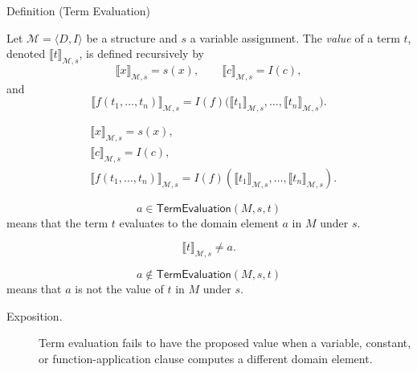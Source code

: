 \begin{definitionbox}{Definition (Term Evaluation)}
\begin{definition}
\label{def:term-interp}
Let \(\mathcal M=\langle D,I\rangle\) be a structure and \(s\) a variable
assignment. The \emph{value} of a term \(t\), denoted
\(\llbracket t\rrbracket_{\mathcal M,s}\), is defined recursively by
\[
\llbracket x\rrbracket_{\mathcal M,s}=s(x),\qquad
\llbracket c\rrbracket_{\mathcal M,s}=I(c),
\]
and
\[
\llbracket f(t_1,\ldots,t_n)\rrbracket_{\mathcal M,s}
=
I(f)\bigl(\llbracket t_1\rrbracket_{\mathcal M,s},\ldots,
\llbracket t_n\rrbracket_{\mathcal M,s}\bigr).
\]
\end{definition}
\end{definitionbox}

\begin{remark*}
\[
\begin{aligned}
&\llbracket x\rrbracket_{\mathcal M,s}=s(x),\\
&\llbracket c\rrbracket_{\mathcal M,s}=I(c),\\
&\llbracket f(t_1,\ldots,t_n)\rrbracket_{\mathcal M,s}
=I(f)(\llbracket t_1\rrbracket_{\mathcal M,s},\ldots,
\llbracket t_n\rrbracket_{\mathcal M,s}).
\end{aligned}
\]
\end{remark*}

\begin{remark*}
\[
  a\in\mathsf{TermEvaluation}(M,s,t)
\] means that the term \(t\) evaluates
to the domain element \(a\) in \(M\) under \(s\).
\end{remark*}

\begin{remark*}
\[
\llbracket t\rrbracket_{\mathcal M,s}\neq a.
\]
\end{remark*}

\begin{remark*}
\[
  a\notin\mathsf{TermEvaluation}(M,s,t)
\] means that \(a\) is not the value
of \(t\) in \(M\) under \(s\).
\end{remark*}

\begin{remark*}
\begin{description}
  \item[Exposition.] Term evaluation fails to have the proposed value when a variable, constant, or
function-application clause computes a different domain element.
\end{description}
\end{remark*}

